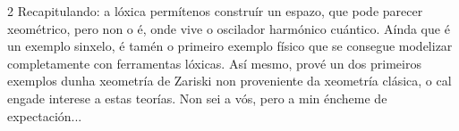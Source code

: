 \begin{multicols}{2}
Recapitulando: a lóxica permítenos construír un espazo, que pode parecer
xeométrico, pero non o é, onde vive o oscilador harmónico cuántico. Aínda que é
un exemplo sinxelo, é tamén o primeiro exemplo físico que se consegue modelizar
completamente con ferramentas lóxicas. Así mesmo, prové un dos primeiros
exemplos dunha xeometría de Zariski non proveniente da xeometría clásica, o cal
engade interese a estas teorías. Non sei a vós, pero a min éncheme de
expectación...

\printbibliography
\end{multicols}
